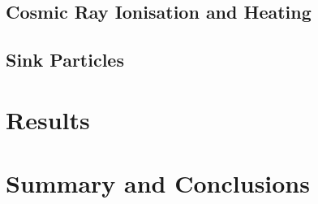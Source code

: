 \documentclass[useAMS,usenatbib]{mn2e}
\begin{document}
\subsection{Cosmic Ray Ionisation and Heating}
\label{CRchem}


\subsection{Sink Particles}
\label{sinkParticles}

\section{Results}
\label{results}

\section{Summary and Conclusions}
\label{conclusions}






%
  
\end{document}
